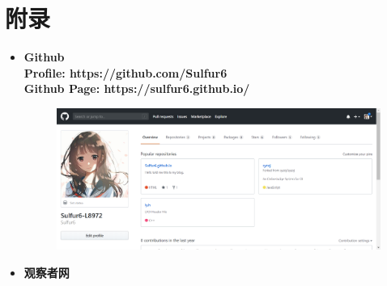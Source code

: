 \documentclass{article}
\begin{document}
\section{附录}
\begin{itemize}
    \item {
        \bf{Github}\\
        Profile: https://github.com/Sulfur6\\
        Github Page: https://sulfur6.github.io/
        \begin{figure}[h]
            \centering
            \includegraphics[scale=0.4]{github}
            \label{fig:github}
        \end{figure}
    }
\newpage
    \item {
        \bf{观察者网}\\
        \begin{figure}[h]
            \centering

\end{figure}}
\end{itemize}
\end{document}
